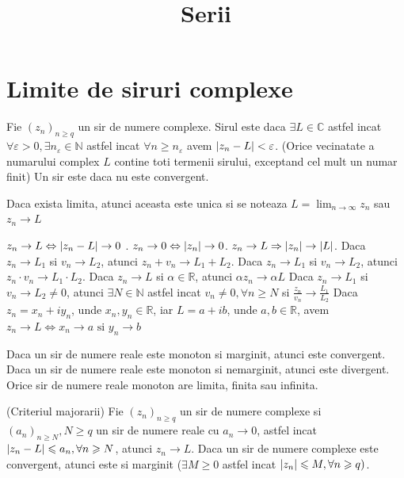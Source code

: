 \documentclass{article}
\title{Serii}
\author{}
\date{}
\begin{document}
\maketitle

\section{Limite de siruri complexe}
  \begin{enumerate}

     Fie $(z_n)_{n \geq q}$ un sir de numere complexe. Sirul este  daca $\exists L \in \mathbb{C}$ astfel incat $\forall \varepsilon > 0, \exists n_{\varepsilon} \in \mathbb{N}$ astfel incat $\forall n \geq n_{\varepsilon}$ avem $\left\lvert z_n - L \right\rvert < \varepsilon$. (Orice vecinatate a numarului complex $L$ contine toti termenii sirului, exceptand cel mult un numar finit)
     Un sir este  daca nu este convergent.

\notatie Daca exista limita, atunci aceasta este unica si se noteaza $L = \lim_{n \to \infty} z_n$ sau $z_n \to L$

\observatie $z_n \to L \Leftrightarrow \left\lvert z_n - L \right\rvert \to 0$ .
\observatie $z_n \to 0 \Leftrightarrow \left\lvert z_n \right\rvert \to 0$.
\observatie $z_n \to L \Rightarrow \left\lvert z_n \right\rvert \to \left\lvert L \right\rvert$.
\proprietate Daca $z_n \to L_1$ si $v_n \to L_2$, atunci $z_n + v_n \to L_1 + L_2$.
\proprietate Daca $z_n \to L_1$ si $v_n \to L_2$, atunci $z_n \cdot v_n \to L_1 \cdot L_2$.
\proprietate Daca $z_n \to L$ si $\alpha \in \mathbb{R}$, atunci $\alpha z_n \to \alpha L$
\proprietate Daca $z_n \to L_1$ si $v_n \to L_2 \neq 0$, atunci $\exists N \in \mathbb{N}$ astfel incat $ v_n \neq 0, \forall n \geq N$ si $\frac{z_n}{v_n} \to \frac{L_1}{L_2}$
\proprietate Daca $z_n = x_n + iy_n$, unde $x_n, y_n \in \mathbb{R}$, iar $L = a + ib$, unde $a, b \in \mathbb{R}$, avem $z_n \to L \Leftrightarrow x_n \to a \text{ si } y_n \to b$

\proprietate Daca un sir de numere reale este monoton si marginit, atunci este convergent.
\proprietate Daca un sir de numere reale este monoton si nemarginit, atunci este divergent.
\proprietate Orice sir de numere reale monoton are limita, finita sau infinita.

\propozitie (Criteriul majorarii) Fie $(z_n)_{n \geq q}$ un sir de numere complexe si $(a_n)_{n \geq N}, N \geq q$ un sir de numere reale cu $a_n \to 0$, astfel incat $\left\lvert z_n - L \right\rvert \leqslant a_n, \forall n \geqslant N$, atunci $z_n \to L$. 
\observatie Daca un sir de numere complexe este convergent, atunci este si marginit ($\exists M \geq 0$ astfel incat $\left\lvert z_n \right\rvert \leqslant M, \forall n \geqslant q)$.


\end{enumerate}
\end{document}
